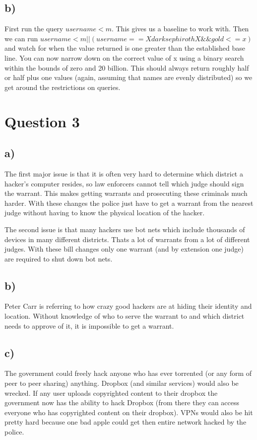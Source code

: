 \documentclass{article}
\begin{document}
\subsection{b)} %
\label{sub:b_}
First run the query $username < m$. This gives us a baseline to work with. Then we can run $username < m || (username == XdarksephirothX \&\& gold <= x)$ and watch for when the value returned is one greater than the established base line. You can now narrow down on the correct value of x using a binary search within the bounds of zero and 20 billion.  This should always return roughly half or half plus one values (again, assuming that names are evenly distributed) so we get around the restrictions on queries. 

\section{Question 3} %
\label{sec:question_3}
\subsection{a)} %
\label{sub:a_}
The first major issue is that it is often very hard to determine which district a hacker's computer resides, so law enforcers cannot tell which judge should sign the warrant. This makes getting warrants and prosecuting these criminals much harder. With these changes the police just have to get a warrant from the nearest judge without having to know the physical location of the hacker. 

The second issue is that many hackers use bot nets which include thousands of devices in many different districts. Thats a lot of warrants from a lot of different judges. With these bill changes only one warrant (and by extension one judge) are required to shut down bot nets.
\subsection{b)} %
\label{sub:b_}
Peter Carr is referring to how crazy good hackers are at hiding their identity and location. Without knowledge of who to serve the warrant to and which district needs to approve of it, it is impossible to get a warrant. 
\subsection{c)} %
\label{sub:c_}
The government could freely hack anyone who has ever torrented (or any form of peer to peer sharing) anything. Dropbox (and similar services) would also be wrecked. If any user uploads copyrighted content to their dropbox the government now has the ability to hack Dropbox (from there they can access everyone who has copyrighted content on their dropbox). VPNs would also be hit pretty hard because one bad apple could get then entire network hacked by the police.
\end{document}
